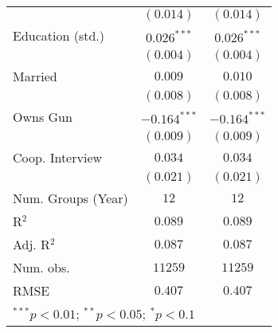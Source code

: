 \begin{table}
\begin{center}
\begin{tabular}{l c c}
                        & $(0.014)$      & $(0.014)$      \\
Education (std.)        & $0.026^{***}$  & $0.026^{***}$  \\
                        & $(0.004)$      & $(0.004)$      \\
Married                 & $0.009$        & $0.010$        \\
                        & $(0.008)$      & $(0.008)$      \\
Owns Gun                & $-0.164^{***}$ & $-0.164^{***}$ \\
                        & $(0.009)$      & $(0.009)$      \\
Coop. Interview         & $0.034$        & $0.034$        \\
                        & $(0.021)$      & $(0.021)$      \\
\midrule
Num. Groups (Year)      & $12$           & $12$           \\
R$^2$                   & $0.089$        & $0.089$        \\
Adj. R$^2$              & $0.087$        & $0.087$        \\
Num. obs.               & $11259$        & $11259$        \\
RMSE                    & $0.407$        & $0.407$        \\
\bottomrule
\multicolumn{3}{l}{\scriptsize{$^{***}p<0.01$; $^{**}p<0.05$; $^{*}p<0.1$}}
\end{tabular}
\label{table_ate}
\end{center}
\end{table}

